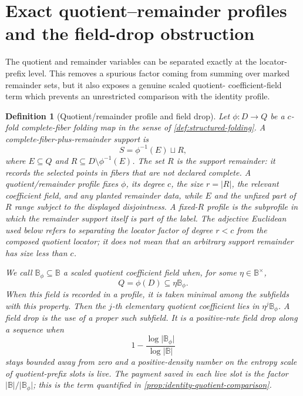 \documentclass[12pt,a4paper]{amsart}
\numberwithin{equation}{section}
\newtheorem{definition}[definition]{Definition}
\theoremstyle{remark}
\newcommand{\B}{\mathbb B}
\newcommand{\abs}[1]{\lvert #1\rvert}
\begin{document}
\section{Exact quotient--remainder profiles and the field-drop obstruction}
\label{sec:quotient-obstruction}

The quotient and remainder variables can be separated exactly at the
locator-prefix level.  This removes a spurious factor coming from summing
over marked remainder sets, but it also exposes a genuine scaled quotient-
coefficient-field term which prevents an unrestricted comparison with the
identity profile.

\begin{definition}[Quotient/remainder profile and field drop]
\label{def:quotient-remainder-profile}
Let \(\phi:D\to Q\) be a \(c\)-fold complete-fiber folding map in the
sense of \cref{def:structured-folding}.  A
\emph{complete-fiber-plus-remainder support} is
\[
                  S=\phi^{-1}(E)\sqcup R,
\]
where \(E\subseteq Q\) and
\(R\subseteq D\setminus\phi^{-1}(E)\).  The set \(R\) is the
\emph{support remainder}: it records the selected points in fibers that
are not declared complete.  A \emph{quotient/remainder profile} fixes
\(\phi\), its degree \(c\), the size \(r=\abs R\), the relevant
coefficient field, and any planted remainder data, while \(E\) and the
unfixed part of \(R\) range subject to the displayed disjointness.
A fixed-\(R\) profile is the subprofile in which the remainder support
itself is part of the label.  The adjective \emph{Euclidean} used below
refers to separating the locator factor of degree \(r<c\) from the
composed quotient locator; it does not mean that an arbitrary support
remainder has size less than \(c\).

We call \(\B_\phi\subseteq\B\) a \emph{scaled quotient coefficient
field} when, for some \(\eta\in\B^\times\),
\[
                         Q=\phi(D)\subseteq\eta\B_\phi .
\]
When this field is recorded in a profile, it is taken minimal among the
subfields with this property.
Then the \(j\)-th elementary quotient coefficient lies in
\(\eta^j\B_\phi\).  A \emph{field drop} is the use of a proper such
subfield.  It is a \emph{positive-rate field drop} along a sequence when
\[
       1-\frac{\log\abs{\B_\phi}}{\log\abs\B}
\]
stays bounded away from zero and a positive-density number on the
entropy scale of quotient-prefix slots is live.  The payment saved in
each live slot is the factor \(\abs\B/\abs{\B_\phi}\); this is the term
quantified in \cref{prop:identity-quotient-comparison}.
\end{definition}
\end{document}
